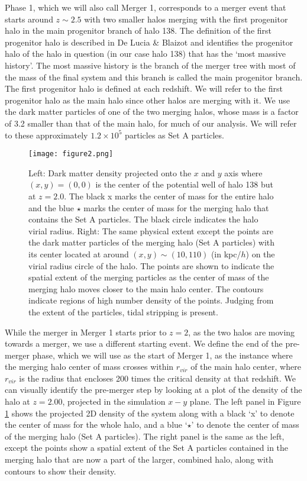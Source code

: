 \documentclass[a4paper,11pt]{article}
\begin{document}
Phase 1, which we will also call Merger 1,  corresponds to a merger event that starts around $z\sim2.5$ with two smaller halos merging with the first progenitor halo in the main progenitor 
branch of halo 138.  The definition of the first progenitor halo is described in De Lucia \& Blaizot \citep{DeL07} and identifies the progenitor halo of the halo in question (in our 
case halo 138) that has the `most massive history'. The most massive history is the branch of the merger tree with most of the mass of the final system and 
this branch is called the main progenitor branch. The first progenitor halo is defined at each redshift.  We will refer to the first progenitor halo as the 
main halo since other halos are merging with it. We use the dark matter particles of one of the two merging halos, whose mass is a factor of 3.2 smaller than 
that of the main halo, for much of our analysis. We will refer to these approximately $1.2\times10^5$ particles as Set A particles. 

\begin{figure}
\centering
\texttt{[image: figure2.png]}
\caption{Left: Dark matter density projected onto the $x$ and $y$ axis where $(x,y)=(0,0)$ is the center of the potential well of halo 138 
but at $z=2.0$.  The black x marks the center of mass for the entire halo and the blue $\star$ marks the center of mass for the merging halo that contains the Set 
A particles.  The black circle indicates the halo virial radius.  Right: The same 
physical extent except the points are the dark matter particles of the merging halo (Set A particles) with its center located at around 
$(x,y)\sim(10,110)$ (in kpc/$h$) on the virial radius circle of the halo.  The points are shown to indicate the spatial extent of the merging 
particles as the center of mass of the merging halo moves closer to the main halo center.  The contours indicate regions of high number density of the 
points.  Judging from the extent of the particles, tidal stripping is present.}
\label{potential68}
\end{figure}

While the merger in Merger 1 starts prior to $z=2$, as the two halos are moving towards a merger, we use a different starting event.  We 
define the end of the pre-merger phase, which we will use as the start of Merger 1, as the instance where the merging halo center of mass crosses within $r_{vir}$ of the 
main halo center, where $r_{vir}$ is the radius that encloses 200 times the critical density at that redshift.  We can visually identify the pre-merger step by looking at a plot of the 
density of the halo at $z=2.00$, projected in the simulation $x-y$ plane.  The left panel in Figure \ref{potential68} shows the projected 2D density of the system 
along with a black `x' to denote the center of mass for the whole halo, and a blue `$\star$' to denote the center of mass of the merging halo (Set A particles).  
The right panel is the same as the left, except the points show a spatial extent of the Set A particles contained in the merging halo that are 
now a part of the larger, combined halo, along with contours to show their density. 
\end{document}

